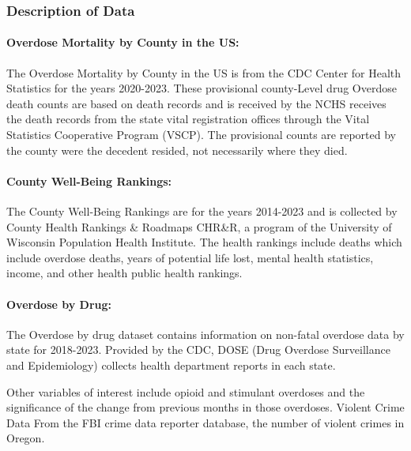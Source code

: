 \documentclass[
]{article}
\begin{document}
\hypertarget{description-of-data}{%
\subsubsection{Description of Data}\label{description-of-data}}

\hypertarget{overdose-mortality-by-county-in-the-us}{%
\paragraph{Overdose Mortality by County in the
US:}\label{overdose-mortality-by-county-in-the-us}}

The Overdose Mortality by County in the US is from the CDC Center for
Health Statistics for the years 2020-2023. These provisional
county-Level drug Overdose death counts are based on death records and
is received by the NCHS receives the death records from the state vital
registration offices through the Vital Statistics Cooperative Program
(VSCP). The provisional counts are reported by the county were the
decedent resided, not necessarily where they died.

\hypertarget{county-well-being-rankings}{%
\paragraph{County Well-Being
Rankings:}\label{county-well-being-rankings}}

The County Well-Being Rankings are for the years 2014-2023 and is
collected by County Health Rankings \& Roadmaps CHR\&R, a program of the
University of Wisconsin Population Health Institute. The health rankings
include deaths which include overdose deaths, years of potential life
lost, mental health statistics, income, and other health public health
rankings.

\hypertarget{overdose-by-drug}{%
\paragraph{Overdose by Drug:}\label{overdose-by-drug}}

The Overdose by drug dataset contains information on non-fatal overdose
data by state for 2018-2023. Provided by the CDC, DOSE (Drug Overdose
Surveillance and Epidemiology) collects health department reports in
each state.

Other variables of interest include opioid and stimulant overdoses and
the significance of the change from previous months in those overdoses.
Violent Crime Data From the FBI crime data reporter database, the number
of violent crimes in Oregon.
\end{document}
